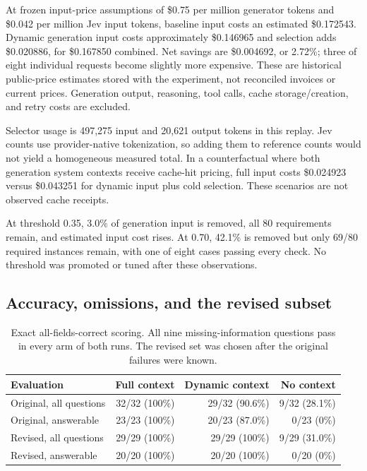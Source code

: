 \documentclass[11pt]{article}
\begin{document}
At frozen input-price assumptions of \$0.75 per million generator tokens and \$0.042 per million Jev input tokens, baseline input costs an estimated \$0.172543. Dynamic generation input costs approximately \$0.146965 and selection adds \$0.020886, for \$0.167850 combined. Net savings are \$0.004692, or 2.72\%; three of eight individual requests become slightly more expensive. These are historical public-price estimates stored with the experiment, not reconciled invoices or current prices. Generation output, reasoning, tool calls, cache storage/creation, and retry costs are excluded.

Selector usage is 497,275 input and 20,621 output tokens in this replay. Jev counts use provider-native tokenization, so adding them to reference counts would not yield a homogeneous measured total. In a counterfactual where both generation system contexts receive cache-hit pricing, full input costs \$0.024923 versus \$0.043251 for dynamic input plus cold selection. These scenarios are not observed cache receipts.

At threshold 0.35, 3.0\% of generation input is removed, all 80 requirements remain, and estimated input cost rises. At 0.70, 42.1\% is removed but only 69/80 required instances remain, with one of eight cases passing every check. No threshold was promoted or tuned after these observations.

\subsection{Accuracy, omissions, and the revised subset}
\begin{table}[htbp]
\centering\small
\begin{tabular}{lrrr}
\toprule
Evaluation & Full context & Dynamic context & No context\\
\midrule
Original, all questions & 32/32 (100\%) & 29/32 (90.6\%) & 9/32 (28.1\%)\\
Original, answerable & 23/23 (100\%) & 20/23 (87.0\%) & 0/23 (0\%)\\
Revised, all questions & 29/29 (100\%) & 29/29 (100\%) & 9/29 (31.0\%)\\
Revised, answerable & 20/20 (100\%) & 20/20 (100\%) & 0/20 (0\%)\\
\bottomrule
\end{tabular}
\caption{Exact all-fields-correct scoring. All nine missing-information questions pass in every arm of both runs. The revised set was chosen after the original failures were known.}
\end{table}
\end{document}
